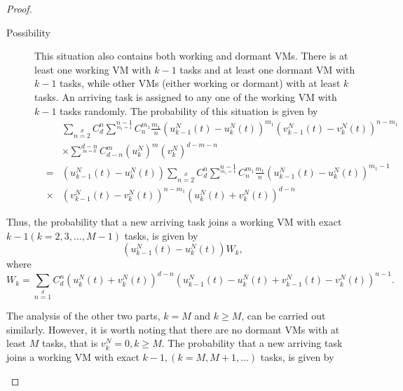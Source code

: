 \documentclass[12pt]{article}
\begin{document}
\begin{proof}
\begin{description}
\begin{description}
\begin{description}
                    \item[Possibility \uppercase\expandafter{}] This situation also contains both working and dormant VMs. There is at least one working VM with $k-1$ tasks and at least one dormant VM with $k-1$ tasks, while other VMs (either working or dormant) with at least $k$ tasks. An arriving task is assigned to any one of the working VM with $k-1$ tasks randomly. The probability of this situation is given by
                            \begin{eqnarray}
                                \nonumber&&\displaystyle\sum\limits_{n=2}\limits^{d}C^{n}_{d}\sum\limits^{n-1}\limits_{m_1=1}
                                            C_{n}^{m_1}\frac{m_1}{n}(u_{k-1}^{N}(t)-u_{k}^{N}(t))^{m_1}(v_{k-1}^{N}(t)-v_{k}^{N}(t))^{n-m_1}\\
                                 \nonumber&&\times\displaystyle\sum\limits^{d-n}\limits_{m=0}C^{m}_{d-n}(u_{k}^{N})^m(v_{k}^{N})^{d-m-n}\\
                                 \nonumber&=&\displaystyle(u_{k-1}^{N}(t)-u_{k}^{N}(t))\displaystyle\sum\limits_{n=2}\limits^{d}C^{n}_{d}
                                            \sum\limits^{n-1}\limits_{m_1=1}C_{n}^{m_1}\frac{m_1}{n}(u_{k-1}^{N}(t)-u_{k}^{N}(t))^{m_1-1}\\
                                          &\times&(v_{k-1}^{N}(t)-v_{k}^{N}(t))^{n-m_1}(u_{k}^{N}(t)+v_{k}^{N}(t))^{d-n}
                            \end{eqnarray}
                 \end{description}
              Thus, the probability that a new arriving task joins a working VM with exact $k-1 (k=2,3,\ldots,M-1)$ tasks, is given by
              \begin{equation*}
                (u_{k-1}^{N}(t)-u_{k}^{N}(t))W_{k},
              \end{equation*}
              where
              \begin{equation}\label{WkleqM-1}
                W_{k}=\sum\limits_{n=1}\limits^{d}C^{n}_{d}(u_{k}^{N}(t)+v_{k}^{N}(t))^{d-n}
                (u_{k-1}^{N}(t)-u_{k}^{N}(t)+v_{k-1}^{N}(t)-v_{k}^{N}(t))^{n-1}.
              \end{equation}
    \end{description}
    The analysis of the other two parts, $k=M$ and $k\geq M$, can be carried out similarly. However, it is worth noting that there are no dormant VMs with at least $M$ tasks, that is $v_{k}^{N}=0, k\geq M$. The probability that a new arriving task joins a working VM with exact $k-1,(k=M,M+1,\ldots)$ tasks, is given by

\end{description}
\end{proof}
\end{document}
